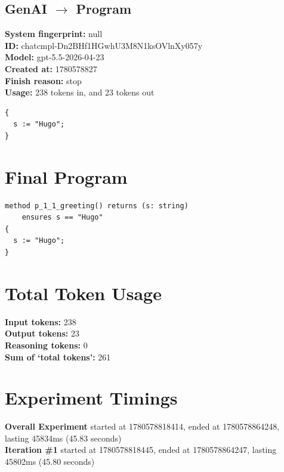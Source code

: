 \documentclass{article}
\begin{document}
\subsection*{GenAI $\rightarrow$ Program}
\textbf{System fingerprint: }null
\\\textbf{ID: }chatcmpl-Dn2BHf1HGwhU3M8N1ksOVlnXy057y
\\\textbf{Model: }gpt-5.5-2026-04-23
\\\textbf{Created at: }1780578827
\\\textbf{Finish reason: }stop
\\\textbf{Usage: }238 tokens in, and 23 tokens out
\begin{lstlisting}
{
  s := "Hugo";
}
\end{lstlisting}
\section*{Final Program}
\begin{lstlisting}
method p_1_1_greeting() returns (s: string)
	ensures s == "Hugo"
{
  s := "Hugo";
}
\end{lstlisting}
\section*{Total Token Usage}
\textbf{Input tokens: }238
\\\textbf{Output tokens: }23
\\\textbf{Reasoning tokens: }0
\\\textbf{Sum of `total tokens': }261
\section*{Experiment Timings}
\textbf{Overall Experiment} started at 1780578818414, ended at 1780578864248, lasting 45834ms (45.83 seconds)
\\\textbf{Iteration \#1} started at 1780578818445, ended at 1780578864247, lasting 45802ms (45.80 seconds)
\end{document}
